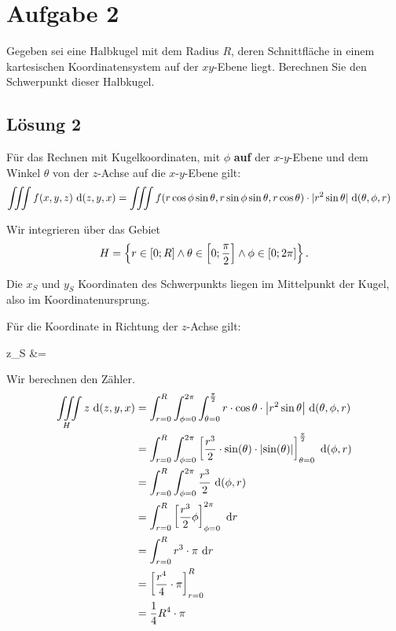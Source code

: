 \documentclass[main.tex]{subfiles}
\begin{document}
\section{Aufgabe 2}
Gegeben sei eine Halbkugel mit dem Radius $R$, deren Schnittfläche in einem kartesischen Koordinatensystem auf der $xy$-Ebene liegt. Berechnen Sie den Schwerpunkt dieser Halbkugel.

\subsection{Lösung 2}
Für das Rechnen mit Kugelkoordinaten, mit $\phi$ \textbf{auf} der $x$-$y$-Ebene und dem Winkel $\theta$ von der $z$-Achse auf die $x$-$y$-Ebene gilt:
\begin{align*}
    \iiint f(x,y,z) \dx{(z,y,x)} &=
        \iiint f(r\cos\phi\sin\theta, r\sin\phi\sin\theta, r\cos\theta )\cdot |r^2\sin\theta| \dx{(\theta, \phi, r)}
\end{align*}

Wir integrieren über das Gebiet
\[
    H = \left\{
        r \in \interval*{0; R} \land
        \theta \in \interval*{0; \frac{\pi}{2}} \land
        \phi \in \interval*{0; 2\pi}
    \right\}.
\]

Die $x_S$ und $y_S$ Koordinaten des Schwerpunkts liegen im Mittelpunkt der Kugel, also im Koordinatenursprung.

Für die Koordinate in Richtung der $z$-Achse gilt:
\begin{equiveqs}[rl]
    z_S &= 
\end{equiveqs}

Wir berechnen den Zähler.
\begin{align*}
\iiint \limits_H z \dx{(z,y,x)}
    &=
    \int_{r=0}^{R}
    \int_{\phi=0}^{2\pi}
    \int_{\theta=0}^{\frac{\pi}{2}}
        r\cdot \cos\theta
        \cdot \abs*{r^2\sin\theta}
    \dx{(\theta, \phi, r)} \\
    &=
    \int_{r=0}^{R}
    \int_{\phi=0}^{2\pi}
    \left[
        \frac{r^3}{2} \cdot \sin(\theta) \cdot \abs*{\sin(\theta)}
    \right]_{\theta=0}^{\frac{\pi}{2}}
    \dx{(\phi, r)} \\
    &=
    \int_{r=0}^{R}
    \int_{\phi=0}^{2\pi}
        \frac{r^3}{2}
    \dx{(\phi, r)} \\
    &=
    \int_{r=0}^{R}
    \left[
        \frac{r^3}{2} \phi
    \right]_{\phi=0}^{2\pi}
    \dx{r} \\
    &=
    \int_{r=0}^{R}
        r^3 \cdot \pi
    \dx{r} \\
    &=
    \left[
        \frac{r^4}{4} \cdot \pi
    \right]_{r=0}^{R} \\
    &=
        \frac{1}{4} R^4 \cdot \pi
\end{align*}
\end{document}
